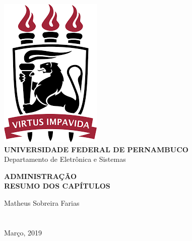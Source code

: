 \documentclass[14pt, oneside]{article}
\date{\vspace{-5ex}}
\theoremstyle{definition}
\begin{document}

    \begin{titlepage}
        \centering 
        \includegraphics[scale = 0.8]{ufpe.png} \\
        \Large{\textbf{UNIVERSIDADE FEDERAL DE PERNAMBUCO}}\\
        \large{Departamento de Eletrônica e Sistemas}
   
        \Huge\textbf{ADMINISTRAÇÃO}\\
        \Large\textbf{RESUMO DOS CAPÍTULOS}
   
        \vfill
        \Large{Matheus Sobreira Farias} \\
        \\~\\
        \Large{Março, 2019}
    \end{titlepage}

\mainmatter
\end{document}
